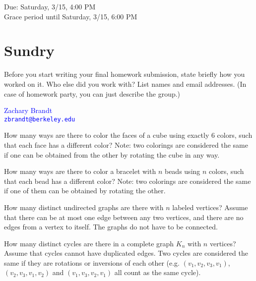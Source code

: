 \documentclass[11pt]{article}
\begin{document}
\maketitle
\fontsize{12}{15}\selectfont

\begin{center}
    Due: Saturday, 3/15, 4:00 PM \\
    Grace period until Saturday, 3/15, 6:00 PM \\
\end{center}

\section*{Sundry}
Before you start writing your final homework submission, state briefly how you 
worked on it.  Who else did you work with?  List names and email addresses. 
(In case of homework party, you can just describe the group.)

\begin{center}
    \textcolor{blue}{
        Zachary Brandt \\
        \nolinkurl{zbrandt@berkeley.edu}
    }
\end{center}

\vspace{15pt}

\begin{Parts}

    \Part How many ways are there to color the faces of a cube using exactly $6$
     colors, such that each face has a different color? Note: two colorings are 
     considered the same if one can be obtained from the other by rotating the 
     cube in any way.

    \Part How many ways are there to color a bracelet with $n$ beads using $n$ 
    colors, such that each bead has a different color? Note: two colorings are 
    considered the same if one of them can be obtained by rotating the other.

    \Part How many distinct undirected graphs are there with $n$ labeled vertices? 
    Assume that there can be at most one edge between any two vertices, and there 
    are no edges from a vertex to itself. The graphs do not have to be connected.

    \Part How many distinct cycles are there in a complete graph $K_n$ with $n$
    vertices? Assume that cycles cannot have duplicated edges. Two cycles are
    considered the same if they are rotations or inversions of each other (e.g.
    $(v_1,v_2,v_3,v_1)$, $(v_2,v_3,v_1,v_2)$ and $(v_1,v_3,v_2,v_1)$ all count as
    the same cycle).

\end{Parts}
\end{document}
